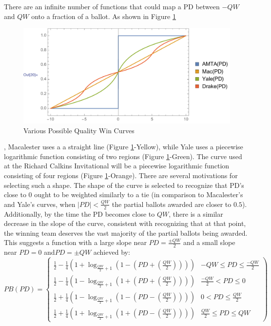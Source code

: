 \documentclass{article}
\begin{document}
There are an infinite number of functions that could map a PD between $-QW$ and $QW$ onto a fraction of a ballot.  As shown in Figure \ref{ballotCurves}
\begin{figure}[h]
\centering
\caption{Various Possible Quality Win Curves}
\label{ballotCurves}
\includegraphics[width=1.0\linewidth]{BallotCurve}
\end{figure}
, Macalester uses a a straight line (Figure \ref{ballotCurves}-Yellow), while Yale uses a piecewise logarithmic function consisting of two regions (Figure \ref{ballotCurves}-Green).  The curve used at the Richard Calkins Invitational will be a piecewise logarithmic function consisting of four regions (Figure \ref{ballotCurves}-Orange).  There are several motivations for selecting such a shape.  The shape of the curve is selected to recognize that PD's close to 0 ought to be weighted similarly to a tie (in comparison to Macalester's and Yale's curves, when $|PD|<\frac{QW}{2}$ the partial ballots awarded are closer to $0.5$).  Additionally, by the time the PD becomes close to $QW$, there is a similar decrease in the slope of the curve, consistent with recognizing that at that point, the winning team deserves the vast majority of the partial ballots being awarded.  This suggests a function with a large slope near $PD=\frac{\pm QW}{2}$ and a small slope near $PD=0$ and$PD=\pm QW$ achieved by:\\
\begin{displaymath}
   PB(PD) = \left\{
     \begin{array}{lr}
       \frac{1}{2}-\frac{1}{4}\left(1+\log_{\frac{QW}{2}+1}\left(1-\left(PD+\left(\frac{QW}{2}\right)\right)\right)\right) &  -QW\le PD\le \frac{-QW}{2}\\
       \frac{1}{2}-\frac{1}{4}\left(1-\log_{\frac{QW}{2}+1}\left(1+\left(PD+\left(\frac{QW}{2}\right)\right)\right)\right) &  \frac{-QW}{2}<PD\le 0\\
       \frac{1}{2}+\frac{1}{4}\left(1-\log_{\frac{QW}{2}+1}\left(1-\left(PD-\left(\frac{QW}{2}\right)\right)\right)\right) &  0<PD\le\frac{QW}{2}\\
       \frac{1}{2}+\frac{1}{4}\left(1+\log_{\frac{QW}{2}+1}\left(1+\left(PD-\left(\frac{QW}{2}\right)\right)\right)\right) & \frac{QW}{2}\le PD \le QW
     \end{array}
  \right)
\end{displaymath}
\end{document}

